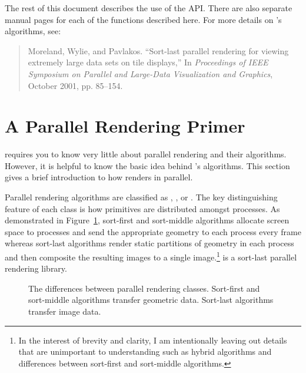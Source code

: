 The rest of this document describes the use of the
\IceT
API.  There are also separate manual pages for each of the functions
described here.  For more details on
\IceT's
algorithms, see:

\begin{quote}
  Moreland, Wylie, and Pavlakos.  ``Sort-last parallel rendering for
  viewing extremely large data sets on tile displays,'' In
  \emph{Proceedings of IEEE Symposium on Parallel and Large-Data
    Visualization and Graphics}, October 2001, pp. 85--154.
\end{quote}


\section{A Parallel Rendering Primer}
\label{sec:Introduction:Parallel_Rendering_Primer}

\IceT requires you to know very little about parallel rendering and their
algorithms.  However, it is helpful to know the basic idea behind \IceT's
algorithms.  This section gives a brief introduction to how \IceT renders
in parallel.

Parallel rendering algorithms are classified as
,
, or
.  The key distinguishing feature of
each class is how primitives are distributed amongst processes.  As
demonstrated in Figure~\ref{fig:Introduction:ParallelRenderingClasses},
sort-first and sort-middle algorithms allocate screen space to processes
and send the appropriate geometry to each process every frame whereas
sort-last algorithms render static partitions of geometry in each process
and then composite the resulting images to a single image.\footnote{In the
  interest of brevity and clarity, I am intentionally leaving out details
  that are unimportant to understanding \IceT such as hybrid algorithms and
  differences between sort-first and sort-middle algorithms.}  \IceT is a
sort-last parallel rendering library.

\begin{figure}
  \label{fig:Introduction:ParallelRenderingClasses}
  \caption{The differences between parallel rendering classes.  Sort-first
    and sort-middle algorithms transfer geometric data.  Sort-last
    algorithms transfer image data.}
\end{figure}

